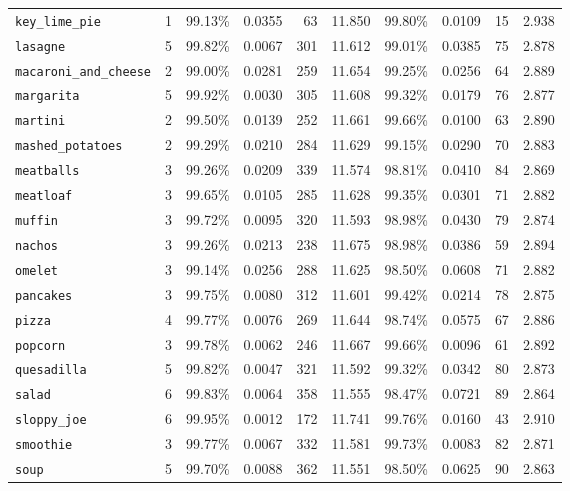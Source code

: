 \documentclass[10pt]{article}
\begin{document}
\begin{table}[htb]
{{\begin{tabularx}{\linewidth}{ l | r | r r r r | r r r r }
							\texttt{key\_lime\_pie} & 1 & 99.13\% & 0.0355 & 63 & 11.850 & 99.80\% & 0.0109 & 15 & 2.938 \\
							\texttt{lasagne} & 5 & 99.82\% & 0.0067 & 301 & 11.612 & 99.01\% & 0.0385 & 75 & 2.878 \\
							\texttt{macaroni\_and\_cheese} & 2 & 99.00\% & 0.0281 & 259 & 11.654 & 99.25\% & 0.0256 & 64 & 2.889 \\
							\texttt{margarita} & 5 & 99.92\% & 0.0030 & 305 & 11.608 & 99.32\% & 0.0179 & 76 & 2.877 \\
							\texttt{martini} & 2 & 99.50\% & 0.0139 & 252 & 11.661 & 99.66\% & 0.0100 & 63 & 2.890 \\
							\texttt{mashed\_potatoes} & 2 & 99.29\% & 0.0210 & 284 & 11.629 & 99.15\% & 0.0290 & 70 & 2.883 \\
							\texttt{meatballs} & 3 & 99.26\% & 0.0209 & 339 & 11.574 & 98.81\% & 0.0410 & 84 & 2.869 \\
							\texttt{meatloaf} & 3 & 99.65\% & 0.0105 & 285 & 11.628 & 99.35\% & 0.0301 & 71 & 2.882 \\
							\texttt{muffin} & 3 & 99.72\% & 0.0095 & 320 & 11.593 & 98.98\% & 0.0430 & 79 & 2.874 \\
							\texttt{nachos} & 3 & 99.26\% & 0.0213 & 238 & 11.675 & 98.98\% & 0.0386 & 59 & 2.894 \\
							\texttt{omelet} & 3 & 99.14\% & 0.0256 & 288 & 11.625 & 98.50\% & 0.0608 & 71 & 2.882 \\
							\texttt{pancakes} & 3 & 99.75\% & 0.0080 & 312 & 11.601 & 99.42\% & 0.0214 & 78 & 2.875 \\
							\texttt{pizza} & 4 & 99.77\% & 0.0076 & 269 & 11.644 & 98.74\% & 0.0575 & 67 & 2.886 \\
							\texttt{popcorn} & 3 & 99.78\% & 0.0062 & 246 & 11.667 & 99.66\% & 0.0096 & 61 & 2.892 \\
							\texttt{quesadilla} & 5 & 99.82\% & 0.0047 & 321 & 11.592 & 99.32\% & 0.0342 & 80 & 2.873 \\
							\texttt{salad} & 6 & 99.83\% & 0.0064 & 358 & 11.555 & 98.47\% & 0.0721 & 89 & 2.864 \\
							\texttt{sloppy\_joe} & 6 & 99.95\% & 0.0012 & 172 & 11.741 & 99.76\% & 0.0160 & 43 & 2.910 \\
							\texttt{smoothie} & 3 & 99.77\% & 0.0067 & 332 & 11.581 & 99.73\% & 0.0083 & 82 & 2.871 \\
							\texttt{soup} & 5 & 99.70\% & 0.0088 & 362 & 11.551 & 98.50\% & 0.0625 & 90 & 2.863 \\

\end{tabularx}}}
\end{table}
\end{document}
